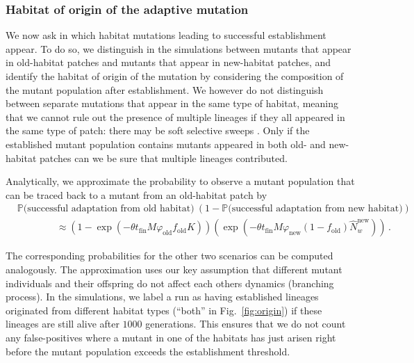 \documentclass[11pt]{article}
\begin{document}
\subsubsection*{Habitat of origin of the adaptive mutation}
We now ask in which habitat mutations leading to successful establishment appear. To do so, we distinguish in the simulations between mutants that appear in old-habitat patches and mutants that appear in new-habitat patches, and identify the habitat of origin of the mutation by considering the composition of the mutant population after establishment. We however do not distinguish between separate mutations that appear in the same type of habitat, meaning that we cannot rule out the presence of multiple lineages if they all appeared in the same type of patch: there may be soft selective sweeps \citep[see][for a review]{hermisson_2017}. Only if the established mutant population contains mutants appeared in both old- and new-habitat patches can we be sure that multiple lineages contributed.

Analytically, we approximate the probability to observe a mutant population that can be traced back to a mutant
from an old-habitat patch by
\begin{equation}\label{eq:origin}
    \begin{aligned}
	&\mathbb{P}\big(\text{successful adaptation from old habitat}\big)\  \left( 1 - \mathbb{P}\big(\text{successful adaptation from new habitat}\big) \right) \\
	& \qquad \qquad \approx \left(1 - \exp\left(-\theta t_{\text{fin}} M \varphi_{\text{old}} f_{\text{old}} K\right)\right)\left(\exp\left(-\theta t_{\text{fin}} M \varphi_{\text{new}} (1-f_{\text{old}}) \widehat{N}_w^{\text{new}}\right)\right)\, .
	\end{aligned}
\end{equation} 

The corresponding probabilities for the other two scenarios can be computed analogously. 
The approximation uses our key assumption that different mutant individuals and their offspring do not affect each others dynamics (branching process). In the simulations, we label a run as having established lineages originated from different habitat types (``both'' in Fig.~\ref{fig:origin}) if these lineages are still alive after $1000$ generations. This ensures that we do not count any false-positives where a mutant in one of the habitats has just arisen right before the mutant population exceeds the establishment threshold.
\end{document}

